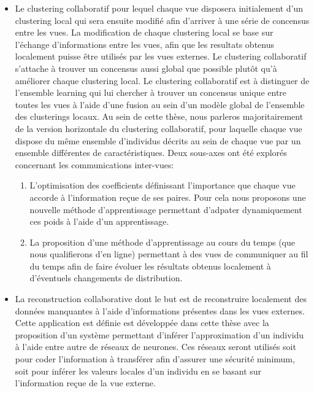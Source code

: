 \documentclass[a4paper]{article}
\begin{document}
\begin{itemize}
    \item Le clustering collaboratif pour lequel chaque vue disposera initialement d'un clustering local qui sera ensuite modifi\'{e} afin d'arriver \`{a} une s\'{e}rie de concensus entre les vues. La modification de chaque clustering local se base sur l'\'{e}change d'informations entre les vues, afin que les resultats obtenus localement puisse \^{e}tre utilis\'{e}s par les vues externes. Le clustering collaboratif s'attache \`{a} trouver un concensus aussi global que possible plutôt qu'\`{a} am\'{e}liorer chaque clustering local. Le clustering collaboratif est à distinguer de l'ensemble learning qui lui chercher à trouver un concensus unique entre toutes les vues à l'aide d'une fusion au sein d'un modèle global de l'ensemble des clusterings locaux. Au sein de cette th\`{e}se, nous parleros majoritairement de la version horizontale du clustering collaboratif, pour laquelle chaque vue dispose du m\^{e}me ensemble d'individus d\'{e}crits au sein de chaque vue par un ensemble diff\'{e}rentes de caractéristiques. Deux sous-axes ont été explorés concernant les communications inter-vues:
        \begin{enumerate}
            \item L'optimisation des coefficients définissant l'importance que chaque vue accorde à l'information reçue de ses paires. Pour cela nous proposons une nouvelle méthode d'apprentissage permettant d'adpater dynamiquement ces poids à l'aide d'un apprentissage.
            \item La proposition d'une méthode d'apprentissage au cours du temps (que nous qualifierons d'en ligne) permettant à des vues de communiquer au fil du temps afin de faire évoluer les résultats obtenus localement à d'éventuels changements de distribution.
        \end{enumerate}

    \item La reconstruction collaborative dont le but est de reconstruire localement des données manquantes à l'aide d'informations présentes dans les vues externes. Cette application est définie est développée dans cette thèse avec la proposition d'un système permettant d'inférer l'approximation d'un individu à l'aide entre autre de réseaux de neurones. Ces réseaux seront utilisés soit pour coder l'information à transférer afin d'assurer une sécurité minimum, soit pour inférer les valeurs locales d'un individu en se basant sur l'information reçue de la vue externe.
\end{itemize}
\end{document}
